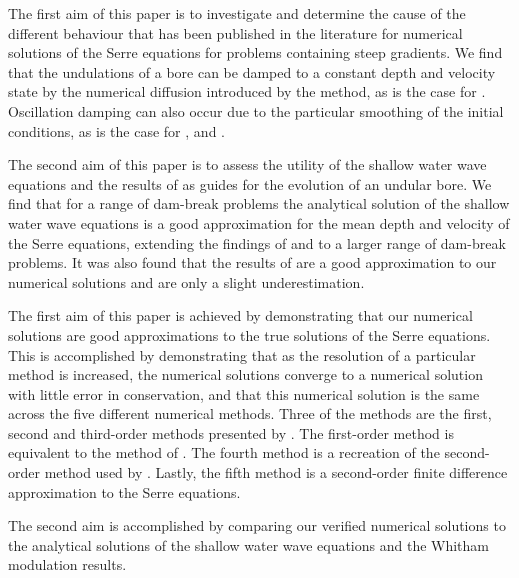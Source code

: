 \documentclass[times]{elsarticle}
\begin{document}
The first aim of this paper is to investigate and determine the cause of the different behaviour that has been published in the literature for numerical solutions of the Serre equations for problems containing steep gradients. We find that the undulations of a bore can be damped to a constant depth and velocity state by the numerical diffusion introduced by the method, as is the case for \citet{Hank-etal-2010-2034}. Oscillation damping can also occur due to the particular smoothing of the initial conditions, as is the case for \citet{Mitsotakis-etal-2017}, \citet{El-etal-2006} and \citet{Mitsotakis-etal-2014}. 

The second aim of this paper is to assess the utility of the shallow water wave equations and the results of \citet{El-etal-2006} as guides for the evolution of an undular bore. We find that for a range of dam-break problems the analytical solution of the shallow water wave equations is a good approximation for the mean depth and velocity of the Serre equations, extending the findings of \citet{Hank-etal-2010-2034} and \citet{Mitsotakis-etal-2014} to a larger range of dam-break problems. It was also found that the results of \citet{El-etal-2006} are a good approximation to our numerical solutions and are only a slight underestimation.

The first aim of this paper is achieved by demonstrating that our numerical solutions are good approximations to the true solutions of the Serre equations. This is accomplished by demonstrating that as the resolution of a particular method is increased, the numerical solutions converge to a numerical solution with little error in conservation, and that this numerical solution is the same across the five different numerical methods. Three of the methods are the first, second and third-order methods presented by \citet{Zoppou-etal-2017}. The first-order method is equivalent to the method of \citet{Hank-etal-2010-2034}. The fourth method is a recreation of the second-order method used by \citet{El-etal-2006}. Lastly, the fifth method is a second-order finite difference approximation to the Serre equations. 

The second aim is accomplished by comparing our verified numerical solutions to the analytical solutions of the shallow water wave equations and the Whitham modulation results. 
 
\end{document}
